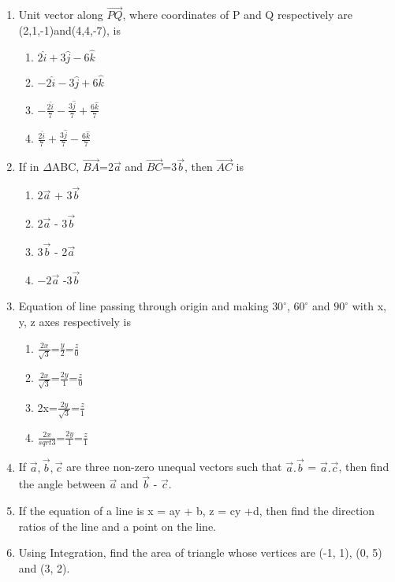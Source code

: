 \documentclass{article}
\begin{document}
\begin{enumerate}
\item Unit vector along $\overrightarrow{PQ}$, where coordinates of P and Q respectively are (2,1,-1)and(4,4,-7), is
\begin{multicols}{2}
\begin{enumerate}
\item $2\hat{i}+3\hat{j}-6\hat{k}$
\item $-2\hat{i}-3\hat{j}+6\hat{k}$
\item $-\frac{2\hat{i}}{7}-\frac{3\hat{j}}{7}+\frac{6\hat{k}}{7}$
\item $\frac{2\hat{i}}{7}+\frac{3\hat{j}}{7}-\frac{6\hat{k}}{7}$
\end{enumerate}
\end{multicols}

\item If in $\Delta$ABC, $\overrightarrow{BA}$=2$\overrightarrow{a}$ and $\overrightarrow{BC}$=3$\overrightarrow{b}$, then $\overrightarrow{AC}$ is
\begin{multicols}{2}
\begin{enumerate}
\item $2\overrightarrow{a}$ + 3$\overrightarrow{b}$
\item $2\overrightarrow{a}$ - 3$\overrightarrow{b}$
\item $3\overrightarrow{b}$ - 2$\overrightarrow{a}$
\item $-2\overrightarrow{a}$ -3$\overrightarrow{b}$
\end{enumerate}
\end{multicols}

\item Equation of line passing through origin and making $ 30^\circ $, $ 60^\circ $ and $ 90^\circ $ with x, y, z axes respectively is
\begin{multicols}{2}
\begin{enumerate}
\item $\frac{2x}{\sqrt{3}}$=$\frac{y}{2}$=$\frac{z}{0}$
\item $\frac{2x}{\sqrt{3}}$=$\frac{2y}{1}$=$\frac{z}{0}$
\item 2x=$\frac{2y}{\sqrt{3}}$=$\frac{z}{1}$
\item $\frac{2x}{sqrt{3}}$=$\frac{2y}{1}$=$\frac{z}{1}$
\end{enumerate}
\end{multicols}

\item If $\overrightarrow{a}, \overrightarrow{b}, \overrightarrow{c}$ are three non-zero unequal vectors such that $\overrightarrow{a}.\overrightarrow{b}$ = $\overrightarrow{a}.\overrightarrow{c}$, then find the angle between $\overrightarrow{a}$ and $\overrightarrow{b}$ - $\overrightarrow{c}$.

\item If the equation of a line is x = ay + b, z = cy +d, then find the direction ratios of the line and a point on the line.

\item Using Integration, find the area of triangle whose vertices are (-1, 1), (0, 5) and (3, 2).
\end{enumerate}
\end{document}
